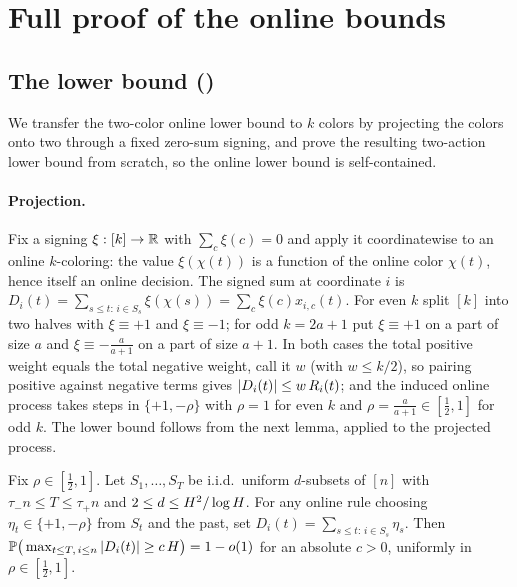 \section{Full proof of the online bounds}\label{app:online}

\subsection{The lower bound ()}\label{app:online-lower-full}

We transfer the two-color online lower bound to $k$ colors by projecting the colors onto two through a fixed zero-sum signing,
and prove the resulting two-action lower bound from scratch, so the online lower bound is self-contained.

\paragraph{Projection.}
Fix a signing $\xi:[k]\to\mathbb{R}$ with $\sum_c\xi(c)=0$ and apply it coordinatewise to an online $k$-coloring: the value
$\xi(\chi(t))$ is a function of the online color $\chi(t)$, hence itself an online decision. The signed sum at coordinate $i$
is $D_i(t)=\sum_{s\le t:\,i\in S_s}\xi(\chi(s))=\sum_c\xi(c)x_{i,c}(t)$. For even $k$ split $[k]$ into two halves with
$\xi\equiv+1$ and $\xi\equiv-1$; for odd $k=2a+1$ put $\xi\equiv+1$ on a part of size $a$ and $\xi\equiv-\tfrac{a}{a+1}$ on a
part of size $a+1$. In both cases the total positive weight equals the total negative weight, call it $w$ (with $w\le k/2$),
so pairing positive against negative terms gives $|D_i(t)|\le w\,R_i(t)$; and the induced online process takes steps in
$\{+1,-\rho\}$ with $\rho=1$ for even $k$ and $\rho=\tfrac{a}{a+1}\in[\tfrac12,1]$ for odd $k$. The lower bound follows from
the next lemma, applied to the projected process.

\begin{lemma}\label{lem:asym-online}
Fix $\rho\in[\tfrac12,1]$. Let $S_1,\dots,S_T$ be i.i.d.\ uniform $d$-subsets of $[n]$ with $\tau_-n\le T\le\tau_+n$ and
$2\le d\le H^2/\log H$. For any online rule choosing $\eta_t\in\{+1,-\rho\}$ from $S_t$ and the past, set
$D_i(t)=\sum_{s\le t:\,i\in S_s}\eta_s$. Then $\mathbb{P}\big(\max_{t\le T,\,i\le n}|D_i(t)|\ge c\,H\big)=1-o(1)$ for an
absolute $c>0$, uniformly in $\rho\in[\tfrac12,1]$.
\end{lemma}

